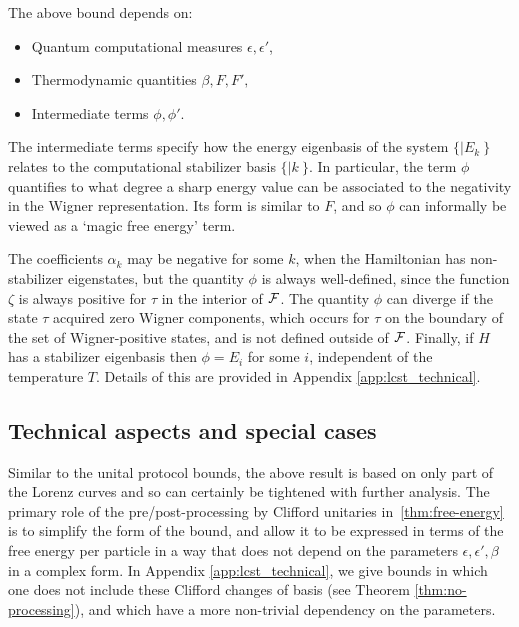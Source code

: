 \documentclass[pra,
aps,
twocolumn,
superscriptaddress,
groupedaddress,
nofootinbib,
reprint
]{revtex4-1}
\begin{document}
The above bound depends on: 
\begin{itemize}
\item Quantum computational measures $\epsilon, \epsilon'$,
\item Thermodynamic quantities $\beta, F, F',$
\item Intermediate terms $\phi, \phi'$. 
\end{itemize}
The intermediate terms specify how the energy eigenbasis of the system $\{|E_k\>\}$ relates to the computational stabilizer basis $\{|k\>\}$.  In particular, the term $\phi$ quantifies to what degree a sharp energy value can be associated to the negativity in the Wigner representation. Its form is similar to $F$, and so $\phi$ can informally be viewed as a `magic free energy' term. 

The coefficients $\alpha_k$ may be negative for some $k$, when the Hamiltonian has non-stabilizer eigenstates, but the quantity $\phi$ is always well-defined, since the function $\zeta$ is always positive for $\tau$ in the interior of ${\mathcal F}$. The quantity $\phi$ can diverge if the state $\tau$ acquired zero Wigner components, which occurs for $\tau$ on the boundary of the set of Wigner-positive states, and is not defined outside of ${\mathcal F}$. Finally, if $H$ has a stabilizer eigenbasis then $\phi = E_i$ for some $i$, independent of the temperature $T$. Details of this are provided in Appendix \ref{app:lcst_technical}.

\subsection{Technical aspects and special cases}
Similar to the unital protocol bounds, the above result is based on only part of the Lorenz curves and so can certainly be tightened with further analysis. The primary role of the pre/post-processing by Clifford unitaries in~\cref{thm:free-energy} is to simplify the form of the bound, and allow it to be expressed in terms of the free energy per particle in a way that does not depend on the parameters $\epsilon, \epsilon', \beta$ in a complex form. In Appendix \ref{app:lcst_technical}, we give bounds in which one does not include these Clifford changes of basis (see Theorem \ref{thm:no-processing}), and which have a more non-trivial dependency on the parameters.
\end{document}
